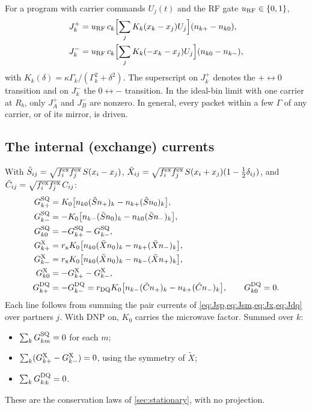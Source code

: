 \documentclass[11pt]{article}
\begin{document}
For a program with carrier commands \(U_j(t)\) and the RF gate \(u_{\rm RF}\in\{0,1\}\),
\begin{align}
  J_k^{+}
  &=u_{\rm RF}\,c_k\Bigl[\sum_jK_k(x_k-x_j)U_j\Bigr](n_{k+}-n_{k0}),
  \label{eq:app-Jplus}\\
  J_k^{-}
  &=u_{\rm RF}\,c_k\Bigl[\sum_jK_k(-x_k-x_j)U_j\Bigr](n_{k0}-n_{k-}),
  \label{eq:app-Jminus}
\end{align}
with \(K_k(\delta)=\kappa\Gamma_k/(\Gamma_k^2+\delta^2)\). The superscript on \(J^+_k\) denotes the
\(+\leftrightarrow0\) transition and on \(J^-_k\) the \(0\leftrightarrow-\) transition. In the
ideal-bin limit with one carrier at \(R_b\), only \(J^+_A\) and \(J^-_B\) are nonzero. In general,
every packet within a few \(\Gamma\) of any carrier, or of its mirror, is driven.

\subsection{The internal (exchange) currents}

With \(\tilde S_{ij}=\sqrt{f^{\rm ex}_if^{\rm ex}_j}\,S(x_i-x_j)\),
\(\tilde X_{ij}=\sqrt{f^{\rm ex}_if^{\rm ex}_j}\,S(x_i+x_j)(1-\tfrac12\delta_{ij})\), and
\(\tilde C_{ij}=\sqrt{f^{\rm ex}_if^{\rm ex}_j}\,C_{ij}\):
\begin{align}
G^{\rm SQ}_{k+}&=K_0\bigl[n_{k0}(\tilde Sn_+)_k-n_{k+}(\tilde Sn_0)_k\bigr],
\label{eq:app-sq-plus}\\
G^{\rm SQ}_{k-}&=-K_0\bigl[n_{k-}(\tilde Sn_0)_k-n_{k0}(\tilde Sn_-)_k\bigr],
\label{eq:app-sq-minus}\\
G^{\rm SQ}_{k0}&=-G^{\rm SQ}_{k+}-G^{\rm SQ}_{k-},
\\
G^{\rm X}_{k+}&=r_{\rm x}K_0\bigl[n_{k0}(\tilde Xn_0)_k-n_{k+}(\tilde Xn_-)_k\bigr],
\label{eq:app-x-plus}\\
G^{\rm X}_{k-}&=r_{\rm x}K_0\bigl[n_{k0}(\tilde Xn_0)_k-n_{k-}(\tilde Xn_+)_k\bigr],
\label{eq:app-x-minus}\\
G^{\rm X}_{k0}&=-G^{\rm X}_{k+}-G^{\rm X}_{k-},
\\
G^{\rm DQ}_{k+}&=-G^{\rm DQ}_{k-}=r_{\rm DQ}K_0\bigl[n_{k-}(\tilde Cn_+)_k-n_{k+}(\tilde Cn_-)_k\bigr],\qquad G^{\rm DQ}_{k0}=0 .
\label{eq:app-dq}
\end{align}
Each line follows from summing the pair currents of \cref{eq:Jsp,eq:Jsm,eq:Jx,eq:Jdq} over
partners \(j\). With DNP on, \(K_0\) carries the microwave factor. Summed over \(k\):
\begin{itemize}
\item \(\sum_kG^{\rm SQ}_{km}=0\) for each \(m\);
\item \(\sum_k(G^{\rm X}_{k+}-G^{\rm X}_{k-})=0\), using the symmetry of \(\tilde X\);
\item \(\sum_kG^{\rm DQ}_{k\pm}=0\).
\end{itemize}
These are the conservation laws of \cref{sec:stationary}, with no projection.
\end{document}
